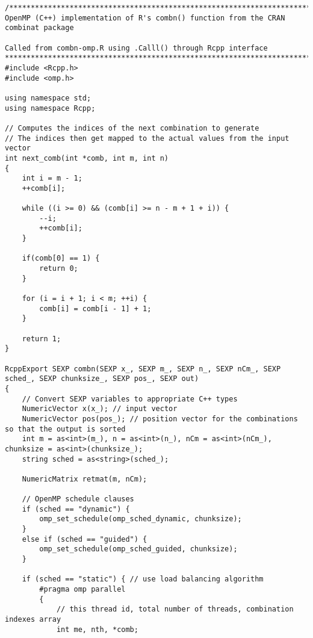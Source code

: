 {



\begin{lstlisting}
/*********************************************************************************
OpenMP (C++) implementation of R's combn() function from the CRAN combinat package

Called from combn-omp.R using .Calll() through Rcpp interface
**********************************************************************************/
#include <Rcpp.h>
#include <omp.h>

using namespace std;
using namespace Rcpp;

// Computes the indices of the next combination to generate 
// The indices then get mapped to the actual values from the input vector
int next_comb(int *comb, int m, int n)
{
	int i = m - 1;	
	++comb[i];
		
	while ((i >= 0) && (comb[i] >= n - m + 1 + i)) {		
		--i;		
		++comb[i];	
	}
		
	if(comb[0] == 1) {
		return 0;
	}
		
	for (i = i + 1; i < m; ++i) {
		comb[i] = comb[i - 1] + 1;		
	}
	
	return 1;
}

RcppExport SEXP combn(SEXP x_, SEXP m_, SEXP n_, SEXP nCm_, SEXP sched_, SEXP chunksize_, SEXP pos_, SEXP out)
{
	// Convert SEXP variables to appropriate C++ types
	NumericVector x(x_); // input vector
	NumericVector pos(pos_); // position vector for the combinations so that the output is sorted
	int m = as<int>(m_), n = as<int>(n_), nCm = as<int>(nCm_), chunksize = as<int>(chunksize_);
	string sched = as<string>(sched_);

	NumericMatrix retmat(m, nCm);
	
	// OpenMP schedule clauses
	if (sched == "dynamic") {
		omp_set_schedule(omp_sched_dynamic, chunksize);
	}
	else if (sched == "guided") {
		omp_set_schedule(omp_sched_guided, chunksize);
	}

	if (sched == "static") { // use load balancing algorithm
		#pragma omp parallel
		{
			// this thread id, total number of threads, combination indexes array
			int me, nth, *comb;


\end{lstlisting}}
